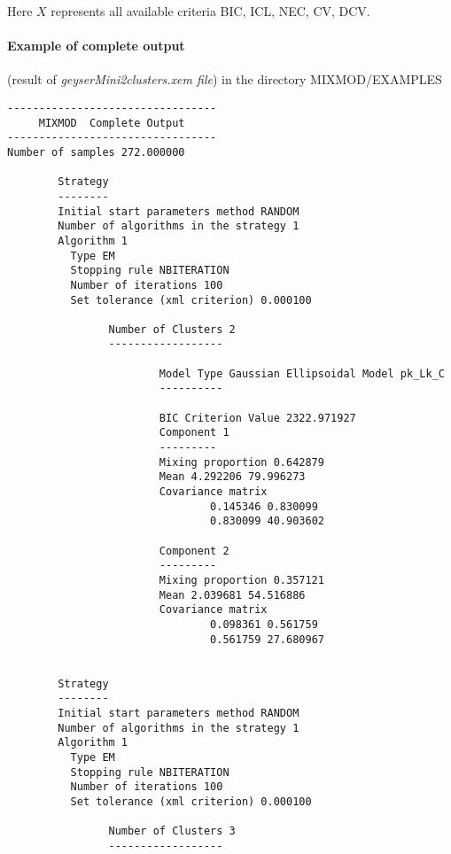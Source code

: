 Here $X$ represents all available criteria BIC, ICL, NEC, CV, DCV.

\paragraph{Example of complete output}(result of {\it geyserMini2clusters.xem file}) in the directory MIXMOD/EXAMPLES

{\scriptsize
\begin{verbatim}
---------------------------------
     MIXMOD  Complete Output
---------------------------------
Number of samples 272.000000

        Strategy
        --------
        Initial start parameters method RANDOM
        Number of algorithms in the strategy 1
        Algorithm 1
          Type EM
          Stopping rule NBITERATION
          Number of iterations 100
          Set tolerance (xml criterion) 0.000100

                Number of Clusters 2
                ------------------

                        Model Type Gaussian Ellipsoidal Model pk_Lk_C
                        ----------

                        BIC Criterion Value 2322.971927
                        Component 1
                        ---------
                        Mixing proportion 0.642879
                        Mean 4.292206 79.996273
                        Covariance matrix
                                0.145346 0.830099
                                0.830099 40.903602

                        Component 2
                        ---------
                        Mixing proportion 0.357121
                        Mean 2.039681 54.516886
                        Covariance matrix
                                0.098361 0.561759
                                0.561759 27.680967


        Strategy
        --------
        Initial start parameters method RANDOM
        Number of algorithms in the strategy 1
        Algorithm 1
          Type EM
          Stopping rule NBITERATION
          Number of iterations 100
          Set tolerance (xml criterion) 0.000100

                Number of Clusters 3
                ------------------


\end{verbatim}}
